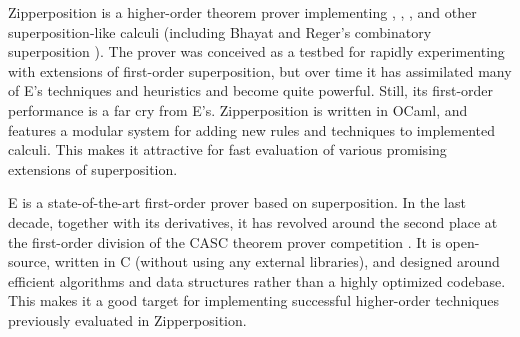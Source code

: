Zipperposition is a higher-order theorem prover implementing \lfsup{},
\lsup{}, \osup{}, and other superposition-like calculi (including Bhayat and
Reger's combinatory superposition \cite{br-20-full-sup-w-combs}). The prover was
conceived as a testbed for rapidly experimenting with extensions of first-order
superposition, but over time it has assimilated many of E's techniques and
heuristics and become quite powerful. Still, its first-order performance is a
far cry from E's. Zipperposition is written in OCaml, and features a modular
system for adding new rules and techniques to implemented calculi.
This makes it attractive for fast evaluation of various promising extensions of
superposition.

 E is a state-of-the-art first-order prover based on superposition.
In the last decade, together with its derivatives, it has revolved around the
second place at the first-order division of the CASC theorem prover
competition \cite{ss-96-casc}. It is open-source, written in C (without using any
external libraries), and designed around efficient algorithms and data structures
rather than a highly optimized codebase. This makes it a good target for implementing
successful higher-order techniques previously evaluated in Zipperposition.


